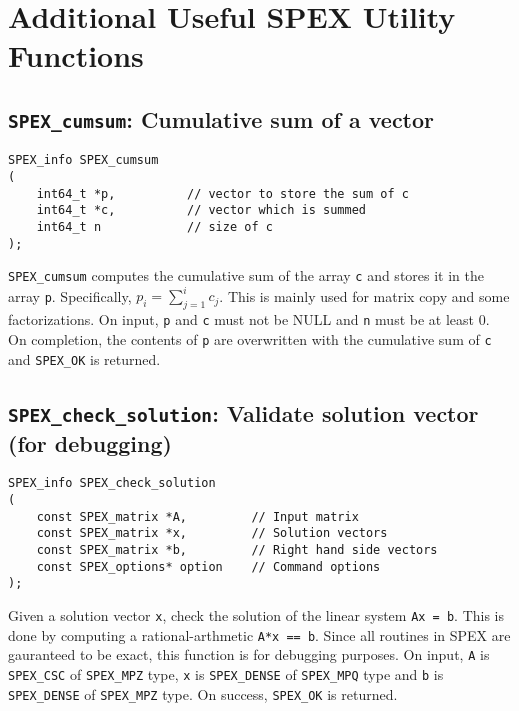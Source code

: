 \documentclass[12pt]{report}
\theoremstyle{definition}
\begin{document}
\section{Additional Useful SPEX Utility Functions}

\cprotect\subsection{\verb|SPEX_cumsum|: Cumulative sum of a vector}


\begin{mdframed}[userdefinedwidth=6in]
{\footnotesize
\begin{verbatim}
SPEX_info SPEX_cumsum
(
    int64_t *p,          // vector to store the sum of c
    int64_t *c,          // vector which is summed
    int64_t n            // size of c
);
\end{verbatim}
} \end{mdframed}


\verb|SPEX_cumsum| computes the cumulative sum of the array \verb|c| and stores it in the array \verb|p|. Specifically, $p_i = \sum_{j = 1}^i c_j$. This is mainly used for matrix copy and some factorizations. On input, \verb|p| and \verb|c| must not be NULL and \verb|n| must be at least 0. On completion, the contents of \verb|p| are overwritten with the cumulative sum of \verb|c| and \verb|SPEX_OK| is returned.


\cprotect\subsection{\verb|SPEX_check_solution|: Validate solution vector (for debugging)}

\begin{mdframed}[userdefinedwidth=6in]
{\footnotesize
\begin{verbatim}
SPEX_info SPEX_check_solution
(
    const SPEX_matrix *A,         // Input matrix
    const SPEX_matrix *x,         // Solution vectors
    const SPEX_matrix *b,         // Right hand side vectors
    const SPEX_options* option    // Command options
);
\end{verbatim}
} \end{mdframed}


Given a solution vector \verb|x|, check the solution of the linear system \verb|Ax = b|. This is done by computing a rational-arthmetic \verb|A*x == b|. Since all routines in SPEX are gauranteed to be exact, this function is for debugging purposes. On input, \verb|A| is \verb|SPEX_CSC| of \verb|SPEX_MPZ| type, \verb|x| is \verb|SPEX_DENSE| of \verb|SPEX_MPQ| type and \verb|b| is \verb|SPEX_DENSE| of \verb|SPEX_MPZ| type. On success, \verb|SPEX_OK| is returned.
\end{document}
